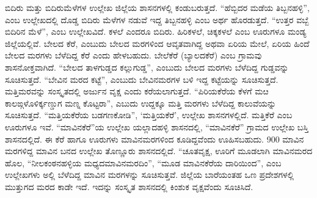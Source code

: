 ಬಿದಿರು ಮತ್ತು ಬಿದಿರುಮೆಳೆಗಳ ಉಲ್ಲೇಖ ಜಿಲ್ಲೆಯ ಶಾಸನಗಳಲ್ಲಿ ಕಂಡುಬರುತ್ತದೆ. “ಹೆಬ್ಬಿದರ ಮಡೆಯ ತಿಬ್ಬನಹಳ್ಳಿ”, ಎಂಬ ಉಲ್ಲೇಖದಲ್ಲಿ ದೊಡ್ಡ ಬಿದಿರು ಮೆಳೆಗಳ ನಡುವೆ ಇದ್ದ ತಿಬ್ಬನಹಳ್ಳಿ ಎಂಬ ಅರ್ಥ ಹೊರಡುತ್ತದೆ. “ಉತ್ತರ ವಬ್ಬೆ ಬಿದಿರಿನ ಮೆಳೆ”, ಎಂಬ ಉಲ್ಲೇಖವಿದೆ. ಕಳಲೆ ಎಂದರೂ ಬಿದಿರು. ಹಿರಿಕಳಲೆ, ಚಿಕ್ಕಕಳಲೆ ಎಂಬ ಊರುಗಳೂ ಮಂಡ್ಯ ಜಿಲ್ಲೆಯಲ್ಲಿವೆ. ಬೇಲದ ಕೆರೆ, ಎಂಬುದು ಬೇಲದ ಮರಗಳಿಂದ ಆವೃತವಾಗಿದ್ದ ಅಥವಾ ಏರಿಯ ಮೇಲೆ, ಏರಿಯ ಹಿಂದೆ ಬೇಲದ ಮರಗಳು ಬೆಳೆದಿದ್ದ ಕೆರೆ ಎಂದು ಹೇಳಬಹುದು. ಬೇಲೆಕೆರೆ (ಬ್ಯಾಲದಕೆರೆ) ಎಂಬ ಗ್ರಾಮವು ಶಾಸನೋಕ್ತವಾಗಿದೆ. “ಬೇಲದ ತಾಳಗುಡ್ಡದ ಕಲ್ಲುಗುಡ್ಡ”, ಎಂಬುದು ಬೇಲದ ಮರಗಳು ಬೆಳೆದಿದ್ದ ಗುಡ್ಡವನ್ನು ಸೂಚಿಸುತ್ತದೆ. “ಬೇವಿನ ಮರದ ಕಟ್ಟೆ”, ಎಂಬುದು ಬೇವಿನಮರಗಳ ಬಳಿ ಇದ್ದ ಕಟ್ಟೆಯನ್ನು ಸೂಚಿಸುತ್ತದೆ. ಮತ್ತಿಮರವನ್ನು ಸಂಸ್ಕೃತದಲ್ಲಿ ಅರ್ಜುನ ವೃಕ್ಷ ಎಂದು ಕರೆಯಲಾಗುತ್ತದೆ. “ಪಿರಿಯಕೆರೆಯ ಕೆಳಗೆ ಮೞ ಕಾಲಙ್ಗಳೊಳಿರ್ಕ್ಕಣ್ಡುಗ ಮಣ್ನ ಕೊಟ್ಟರಾ”, ಎಬುದು ಉದ್ದಕ್ಕೂ ಮತ್ತಿ ಮರಗಳು ಬೆಳೆದಿದ್ದ ಕಾಲುವೆಯನ್ನು ಸೂಚಿಸುತ್ತದೆ. “ಮತ್ತಿಯಕೆರೆಯ ಬಡಗಣಕೋಡಿ”, ‘ಮತ್ತಿಯಕೆರೆ’, ಉಲ್ಲೇಖ ಶಾಸನಗಳಲ್ಲಿದೆ. ಮತ್ತಿಕೆರೆ ಎಂಬ ಊರುಗಳೂ ಇವೆ. “ಮಾವಿನಕೆರೆ”ಯ ಉಲ್ಲೇಖ ಯಲ್ಲಾದಹಳ್ಳಿ ಶಾಸನದಲ್ಲಿ, “ಮಾವಿನಕೆರೆ” ಗ್ರಾಮದ ಉಲ್ಲೇಖ ಬಸ್ತಿ ಶಾಸನದಲ್ಲಿದೆ. ಈ ಕೆರೆ ಹಾಗೂ ಊರುಗಳು ಮಾವಿನಮರಗಳಿಂದ ಕೂಡಿದ್ದವೆಂದು ಊಹಿಸಬಹುದು. 900 ಮಾವಿನ ಮರಗಳಿದ್ದ ಮಾವಿನ ಬನದ ಉಲ್ಲೇಖ ತೊಣ್ಣೂರು ಶಾಸನದಲ್ಲಿದೆ. “ಚೂತವೃಕ್ಷ, ಊರಿಗೆ ಮೂಡಲಾಗಿ ಮಾವಿನಮರದ ಹೊಲ, “ನೀಲಕಂಠನಹಳ್ಳಿಯ ಮಧ್ಯದ\break ಮಾವಿನಮರದಿಂ”, “ಮೂಡ ಮಾವಿನಕೆರೆಯ ದಾರಿಯಿಂದ”, ಎಂಬ ಉಲ್ಲೇಖಗಳು ಅಲ್ಲಿ ಬೆಳೆದಿದ್ದ ಮಾವಿನ ಮರಗಳನ್ನು ಸೂಚಿಸುತ್ತವೆ. ಜಿಲ್ಲೆಯ ಬಾರೆಯಂತಹ ಒಣ ಪ್ರದೇಶಗಳಲ್ಲಿ ಮುತ್ತುಗದ ಮರದ ಕಾಡೇ ಇದೆ. ಇದನ್ನು ಸಂಸ್ಕೃತ ಶಾಸನದಲ್ಲಿ ಕಿಂಶುಕ ವೃಕ್ಷವೆಂದು ಸೂಚಿಸಿದೆ.

